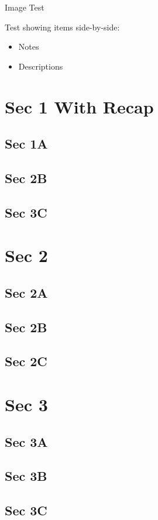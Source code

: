 
\begin{frame}{Image Test}

 Test showing items side-by-side:
 {}
 {
     \begin{itemize}
         \item Notes
         \item Descriptions
     \end{itemize}
}
\end{frame}

\section{Sec 1 With Recap}
\subsection{Sec 1A}
\subsection{Sec 2B}
\subsection{Sec 3C}
\sectionrecap{}


\section{Sec 2}
\subsection{Sec 2A}
\subsection{Sec 2B}
\subsection{Sec 2C}

\section{Sec 3}
\subsection{Sec 3A}
\subsection{Sec 3B}
\subsection{Sec 3C}